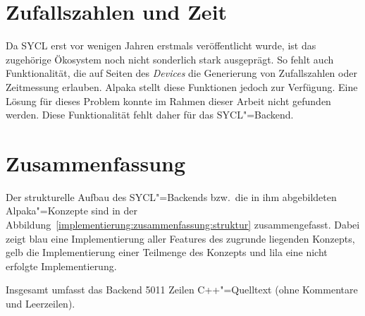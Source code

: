 \section{Zufallszahlen und Zeit}

Da SYCL erst vor wenigen Jahren erstmals veröffentlicht wurde, ist das
zugehörige Ökosystem noch nicht sonderlich stark ausgeprägt. So fehlt auch
Funktionalität, die auf Seiten des \textit{Devices} die Generierung von
Zufallszahlen oder Zeitmessung erlauben. Alpaka stellt diese Funktionen jedoch
zur Verfügung. Eine Lösung für dieses Problem konnte im Rahmen dieser Arbeit
nicht gefunden werden. Diese Funktionalität fehlt daher für das SYCL"=Backend.

\section{Zusammenfassung}

Der strukturelle Aufbau des SYCL"=Backends bzw.\ die in ihm abgebildeten
Alpaka"=Konzepte sind in der
Abbildung~\ref{implementierung:zusammenfassung:struktur} zusammengefasst. Dabei
zeigt blau eine Implementierung aller Features des zugrunde liegenden Konzepts,
gelb die Implementierung einer Teilmenge des Konzepts und lila eine
nicht erfolgte Implementierung.

Insgesamt umfasst das Backend \num{5011} Zeilen C++"=Quelltext (ohne Kommentare
und Leerzeilen).

